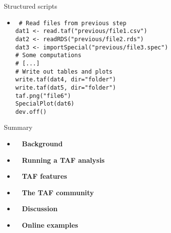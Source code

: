 \documentclass[aspectratio=169]{beamer}
\begin{document}

\begin{frame}{Structured scripts}\small
  \begin{itemize}\item[]\tt\fns
    {\gray \# Read files from previous step}\\
    dat1 <- {\blue read.taf}("previous/file1.csv")\\
    dat2 <- {\blue readRDS}("previous/file2.rds")\\
    dat3 <- {\blue importSpecial}("previous/file3.spec")\\[1em]
    {\gray \# Some computations}\\
    {\gray \# [...]}\\[1em]
    {\gray \# Write out tables and plots}\\
    {\blue write.taf}(dat4, dir="folder")\\
    {\blue write.taf}(dat5, dir="folder")\\
    {\blue taf.png}("file6")\\
    {\blue SpecialPlot}(dat6)\\
    {\blue dev.off}()\\[3ex]
  \end{itemize}
\end{frame}


\begin{frame}{Summary}
  \begin{itemize}
    \item[] {\bf{}~ Background} \\[3ex]
    \item[] {\bf{}~ Running a TAF analysis} \\[3ex]
    \item[] {\bf{}~ TAF features} \\[3ex]
    \item[] {\bf{}~ The TAF community} \\[3ex]
    \item[] {\bf{}~ Discussion} \\[3ex]
    \item[] {\bf{}~ Online examples} \\[3ex]
  \end{itemize}
\end{frame}
\end{document}
